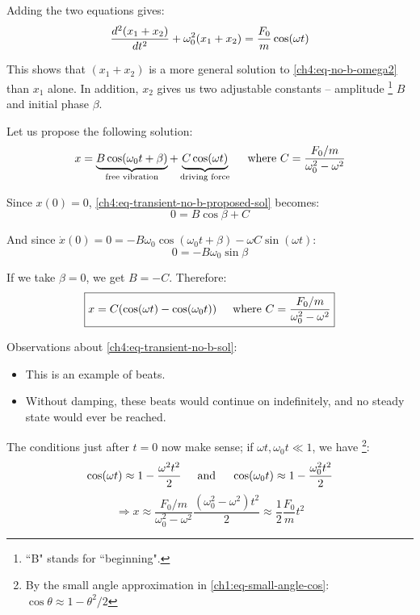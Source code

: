 Adding the two equations gives:
\[ \frac{d^2(x_1+x_2)}{dt^2} + \omega_0^2(x_1+x_2) = \frac{F_0}{m} \cos(\omega t) \]

This shows that $(x_1+x_2)$ is a more general solution to \eqref{ch4:eq-no-b-omega2} than $x_1$ alone. In addition, $x_2$ gives us two adjustable constants -- amplitude%
\footnote{``B" stands for ``beginning".}
$B$ and initial phase $\beta$.

Let us propose the following solution:
\begin{equation}
	x = \underbrace{B\cos(\omega_0 t + \beta)}_\text{free vibration} + \underbrace{C\cos(\omega t)}_\text{driving force}
	\hspace{0.5cm}\text{where }
	C = \frac{F_0/m}{\omega_0^2 - \omega^2}
	\label{ch4:eq-transient-no-b-proposed-sol}
\end{equation}

Since $x(0)=0$, \eqref{ch4:eq-transient-no-b-proposed-sol} becomes:
\[ 0 = B\cos\beta + C \]

And since $\dot{x}(0) = 0 = -B\omega_0 \cos(\omega_0 t + \beta) - \omega C \sin(\omega t)$:
\[ 0 = -B\omega_0 \sin\beta \]

If we take $\beta=0$, we get $B=-C$. Therefore:
\begin{equation}
\boxed{
	x = C(\cos(\omega t) - \cos(\omega_0 t))
	\hspace{0.5cm}\text{where }
	C = \frac{F_0/m}{\omega_0^2 - \omega^2}
}
\label{ch4:eq-transient-no-b-sol}
\end{equation}

Observations about \eqref{ch4:eq-transient-no-b-sol}:
\begin{itemize}
	\item This is an example of beats.
	\item Without damping, these beats would continue on indefinitely, and no steady state would ever be reached.
\end{itemize}

The conditions just after $t=0$ now make sense; if $\omega t, \omega_0 t \ll 1$, we have%
\footnote{By the small angle approximation in \eqref{ch1:eq-small-angle-cos}: $\cos\theta \approx 1-\theta^2/2$}:
\begin{equation*}
	\cos(\omega t) \approx 1 - \frac{\omega^2 t^2}{2} \hspace{0.5cm}\text{and}\hspace{0.5cm} \cos(\omega_0 t) \approx 1 - \frac{\omega_0^2 t^2}{2}
\end{equation*}
\begin{equation*}
	\Longrightarrow
	x \approx \frac{F_0/m}{\omega_0^2 - \omega^2} \frac{(\omega_0^2 - \omega^2)t^2}{2} 
	\approx \frac{1}{2} \frac{F_0}{m} t^2
\end{equation*}

